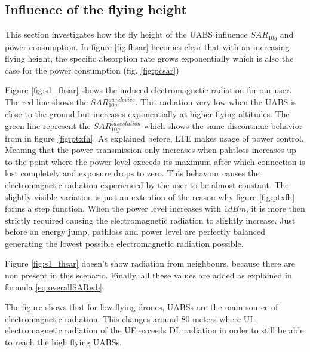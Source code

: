 \subsection{Influence of the flying height}
\label{sub:senario1_influenceOfFlyHeight}

This section investigates how the fly height of the \gls{UABS} influence $SAR_{10g}$ and power consumption. In figure \ref{fig:fhsar}
becomes clear that with an increasing flying height, the specific absorption rate grows exponentially 
which is also the case for the power consumption (fig. \ref{fig:pcsar})  

Figure \ref{fig:s1_fhsar} shows the induced electromagnetic radiation for our user. The red line shows the $SAR^{own device}_{10g}$. This radiation very low when the \gls{UABS}
is close to the ground but increases exponentially at higher flying altitudes. The green line represent the $SAR^{basestation}_{10g}$ which shows the same discontinue 
behavior from in figure \ref{fig:ptxfh}. As explained before, \gls{LTE} makes usage of power control. Meaning that the power transmission only increases when pahtloss 
increases up to the point where the power level exceeds its maximum after which connection is lost completely and exposure drops to zero. 
This behavour causes the electromagnetic radiation experienced by the user to be almost constant. The slightly visible variation is just an extention of the reason 
why figure \ref{fig:ptxfh} forms a step function. When the power level increases with $1 dBm$, it is more then strictly required causing the electromagnetic radiation to 
slightly increase. Just before an energy jump, pathloss and power level are perfectly balanced generating the lowest possible electromagnetic radiation possible.

Figure \ref{fig:s1_fhsar} doesn't show radiation from neighbours, because there are non present in this scenario. Finally, all these values are added as explained in formula
\ref{eq:overallSARwb}. 

The figure shows that for low flying drones, \gls{UABS}s are the main source of electromagnetic radiation.
This changes around 80 meters where \gls{UL} electromagnetic radiation of the \gls{UE}
exceeds \gls{DL} radiation in order to still be able to reach the high flying \gls{UABS}s.


